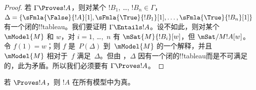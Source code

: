 \documentclass[../../../include/open-logic-section]{subfiles}
\begin{document}
\begin{proof}
  若 $\Gamma \Proves !A$，则对某个 $!B_1$, \dots, $!B_n \in \Gamma$，$\Delta = \{\sFmla{\False}{!A}[1], \sFmla{\True}{!B_1}[1], \dots, \sFmla{\True}{!B_n}[1]\}$ 有一个闭的!!{tableau}。我们要证明 $\Gamma \Entails !A$。设不如此，则对某个 $\mModel{M}$ 和 $w$，对 $i=1$, \dots,~$n$ 有 $\mSat{M}{!B_i}[w]$，但 $\mSat/{M}{!A}[w]$。令 $f(1) = w$；则 $f$ 是~$P(\Delta)$ 到~$\mModel{M}$ 的一个解释，并且 $\mModel{M}$ 相对于~$f$ 满足~$\Delta$。但由 ，$\Delta$ 因有一个闭的!!{tableau}而是不可满足的，此为矛盾。所以我们必须要有 $\Gamma \Proves !A$。
\end{proof}

\begin{cor}
若 $\Proves !A$，则 $!A$ 在所有模型中为真。
\end{cor}
\end{document}
